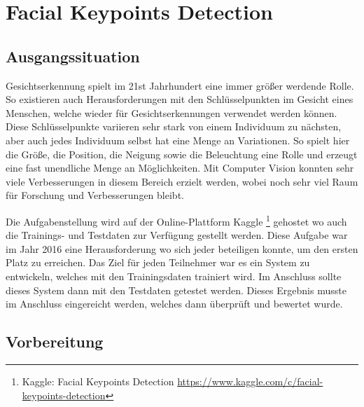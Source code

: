 \chapter{Facial Keypoints Detection}
\label{cha:Facial Keypoints Detection}

\section{Ausgangssituation}

Gesichtserkennung spielt im 21st Jahrhundert eine immer größer werdende Rolle. 
So existieren auch Herausforderungen mit den Schlüsselpunkten im Gesicht eines Menschen, welche wieder für Gesichtserkennungen verwendet werden können. 
Diese Schlüsselpunkte variieren sehr stark von einem Individuum zu nächsten, aber auch jedes Individuum selbst hat eine Menge an Variationen. 
So spielt hier die Größe, die Position, die Neigung sowie die Beleuchtung eine Rolle und erzeugt eine fast unendliche Menge an Möglichkeiten. 
Mit Computer Vision konnten sehr viele Verbesserungen in diesem Bereich erzielt werden, wobei noch sehr viel Raum für Forschung und Verbesserungen bleibt. \newline

\noindent
Die Aufgabenstellung wird auf der Online-Plattform Kaggle \footnote{Kaggle: Facial Keypoints Detection \url{https://www.kaggle.com/c/facial-keypoints-detection}} gehostet wo auch die Trainings- und Testdaten zur Verfügung gestellt werden. 
Diese Aufgabe war im Jahr 2016 eine Herausforderung wo sich jeder beteiligen konnte, um den ersten Platz zu erreichen. 
Das Ziel für jeden Teilnehmer war es ein System zu entwickeln, welches mit den Trainingsdaten trainiert wird.
Im Anschluss sollte dieses System dann mit den Testdaten getestet werden. 
Dieses Ergebnis musste im Anschluss eingereicht werden, welches dann überprüft und bewertet wurde. 

\section{Vorbereitung}

